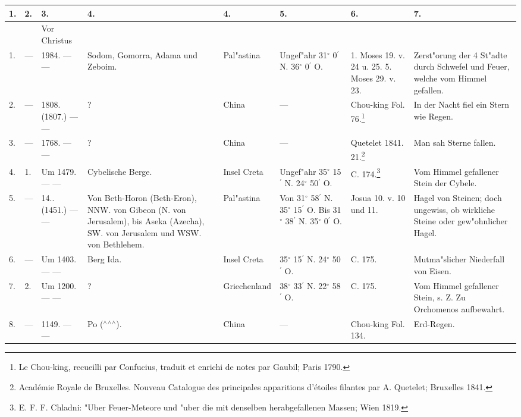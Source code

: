 \documentclass[a4paper, 8pt, oneside, polutonikogreek, german]{article}
\begin{document}
\begin{center}
    \footnotesize
    \begin{longtable}{| p{5mm} | p{3mm} | p{15mm} | p{25mm} | p{20mm} | p{14mm} | p{17mm} | p{24mm} |}
    \hline
        1. & 2. & 3. & 4. & 4. & 5. & 6. & 7. \\ \hline
          &   & Vor Christus &   &   &   &   &   \\ \hline
        1. & --- & 1984. --- --- & Sodom, Gomorra, Adama und Zeboim. & Pal"astina & Ungef"ahr 31$^\circ$ 0$^\prime$ N. 36$^\circ$ 0$^\prime$ O. & 1. Moses 19. v. 24 u. 25. 5. Moses 29. v. 23. & Zerst"orung der 4 St"adte durch Schwefel und Feuer, welche vom Himmel gefallen. \\ \hline
        2. & --- & 1808. (1807.) --- --- & ? & China & --- & Chou-king Fol. 76.\footnote{Le Chou-king, recueilli par Confucius, traduit et enrichi de notes par Gaubil; Paris 1790.} & In der Nacht fiel ein Stern wie Regen. \\ \hline
        3. & --- & 1768. --- --- & ? & China & --- & Quetelet 1841. 21.\footnote{Académie Royale de Bruxelles. Nouveau Catalogue des principales apparitions d'étoiles filantes par A. Quetelet; Bruxelles 1841.} & Man sah Sterne fallen. \\ \hline
        4. & 1. & Um 1479. --- --- & Cybelische Berge. & Insel Creta & Ungef"ahr 35$^\circ$ 15$^\prime$ N. 24$^\circ$ 50$^\prime$ O. & C. 174.\footnote{E. F. F. Chladni: "Uber Feuer-Meteore und "uber die mit denselben herabgefallenen Massen; Wien 1819.} & Vom Himmel gefallener Stein der Cybele. \\ \hline
        5. & --- & 14.. (1451.) --- --- & Von Beth-Horon (Beth-Eron), NNW. von Gibeon (N. von Jerusalem), bis Aseka (Azecha), SW. von Jerusalem und WSW. von Bethlehem. & Pal"astina & Von 31$^\circ$ 58$^\prime$ N. 35$^\circ$ 15$^\prime$ O. Bis 31$^\circ$ 38$^\prime$ N. 35$^\circ$ 0$^\prime$ O. & Josua 10. v. 10 und 11. & Hagel von Steinen; doch ungewiss, ob wirkliche Steine oder gew"ohnlicher Hagel. \\ \hline
        6. & --- & Um 1403. --- --- & Berg Ida. & Insel Creta & 35$^\circ$ 15$^\prime$ N. 24$^\circ$ 50$^\prime$ O. & C. 175. & Mutma"slicher Niederfall von Eisen. \\ \hline
        7. & 2. & Um 1200. --- --- & ? & Griechenland & 38$^\circ$ 33$^\prime$ N. 22$^\circ$ 58$^\prime$ O. & C. 175. & Vom Himmel gefallener Stein, s. Z. Zu Orchomenos aufbewahrt. \\ \hline
        8. & --- & 1149. --- --- & Po ($^\wedge$$^\wedge$$^\wedge$). & China & --- & Chou-king Fol. 134. & Erd-Regen. \\ \hline

\end{longtable}
\end{center}
\end{document}
